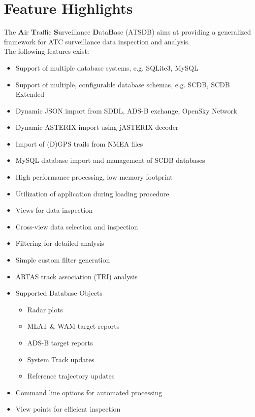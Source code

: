 \section{Feature Highlights}

The \textbf{A}ir \textbf{T}raffic \textbf{S}urveillance \textbf{D}ata\textbf{B}ase (ATSDB) aims at providing a generalized framework for ATC surveillance data inspection and analysis. \\

The following features exist: \\

\begin{itemize}  
\item Support of multiple database systems, e.g. SQLite3, MySQL
\item Support of multiple, configurable database schemas, e.g. SCDB, SCDB Extended
\item Dynamic JSON import from SDDL, ADS-B exchange, OpenSky Network
\item Dynamic ASTERIX import using jASTERIX decoder
\item Import of (D)GPS trails from NMEA files
\item MySQL database import and management of SCDB databases
\item High performance processing, low memory footprint
\item Utilization of application during loading procedure
\item Views for data inspection
\item Cross-view data selection and inspection
\item Filtering for detailed analysis
\item Simple custom filter generation
\item ARTAS track association (TRI) analysis
\item Supported Database Objects
\begin{itemize}  
\item Radar plots
\item MLAT \& WAM target reports
\item ADS-B target reports
\item System Track updates
\item Reference trajectory updates
\end{itemize}
\item Command line options for automated processing
\item View points for efficient inspection
\end{itemize} 
